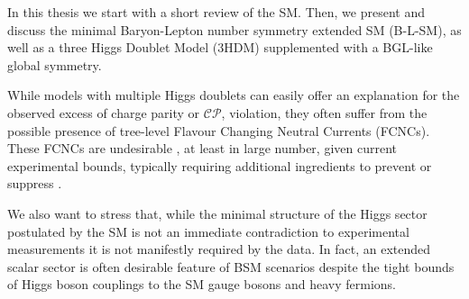 
In this thesis we start with a short review of the SM. Then, we present and discuss the minimal Baryon-Lepton number symmetry extended SM (B-L-SM), as well as a three Higgs Doublet Model (3HDM) supplemented with a BGL-like global symmetry. 

%
%
%

While models with multiple Higgs doublets can easily offer an explanation for the observed excess of charge parity or $\mathcal{CP}$, violation, they often suffer from the possible presence of tree-level Flavour Changing Neutral Currents (FCNCs). 
%
These FCNCs are undesirable \cite{ILYUSHIN2020114921}, at least in large number, given current experimental bounds, typically requiring additional ingredients to prevent or suppress \cite{Huitu2019}. %

We also want to stress that, while the minimal structure of the Higgs sector postulated by the SM is not an immediate contradiction to experimental measurements it is not manifestly required by the data. 
%
In fact, an extended scalar sector is often desirable feature of BSM scenarios despite the tight bounds of Higgs boson couplings to the SM gauge bosons and heavy fermions. 

